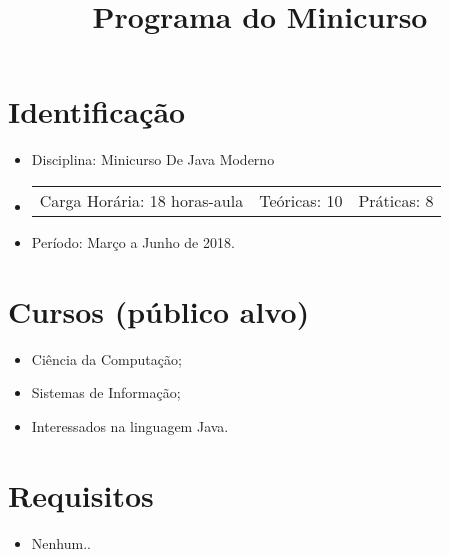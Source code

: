 \documentclass{article}
\title{Programa do Minicurso}
\author{}
\date{}
\begin{document}
\maketitle

\section{Identificação}

\begin{itemize}
    \item[] Disciplina: Minicurso De Java Moderno
    \item[]
        \hspace{-1em}
        \begin{tabular}{ccc}
            Carga Horária: 18 horas-aula&
            Teóricas: 10&
            Práticas: 8
        \end{tabular}
    \item[] Período: Março a Junho de
                     2018.
\end{itemize}

\section{Cursos (público alvo)}
\begin{itemize}
    \item[] Ciência da Computação;
    \item[] Sistemas de Informação;
    \item[] Interessados na linguagem Java.
\end{itemize}

\section{Requisitos}
\begin{itemize}
    \item[] Nenhum..
\end{itemize}
\end{document}
